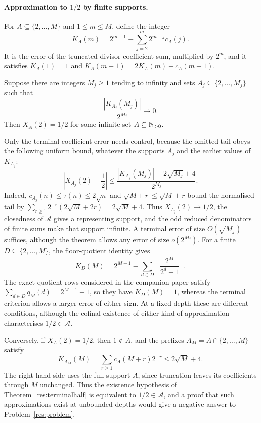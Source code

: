 \documentclass[11pt]{article}
\newcommand{\Ach}{\mathcal A}
\begin{document}
\paragraph{Approximation to $1/2$ by finite supports.}
For $A\subseteq\{2,\ldots,M\}$ and $1\le m\le M$, define the integer
\[
 K_A(m)=2^{m-1}-\sum_{j=2}^{m}2^{m-j}c_A(j).
\]
It is the error of the truncated divisor-coefficient sum, multiplied by
$2^m$, and it satisfies $K_A(1)=1$ and $K_A(m+1)=2K_A(m)-c_A(m+1)$.

\begin{theorem}
\label{res:terminalhalf}
Suppose there are integers $M_j\ge1$ tending to infinity and sets
$A_j\subseteq\{2,\ldots,M_j\}$ such that
\[
 \frac{|K_{A_j}(M_j)|}{2^{M_j}}\longrightarrow0.
\]
Then $X_A(2)=1/2$ for some infinite set $A\subseteq\mathbb{N}_{>0}$.
\end{theorem}

Only the terminal coefficient error needs control, because the omitted
tail obeys the following uniform bound, whatever the supports $A_j$ and
the earlier values of $K_{A_j}$:
\[
 \left|X_{A_j}(2)-\frac12\right|
 \le \frac{|K_{A_j}(M_j)|+2\sqrt{M_j}+4}{2^{M_j}}.
\]
Indeed, $c_{A_j}(n)\le\tau(n)\le2\sqrt n$ and
$\sqrt{M+r}\le\sqrt M+r$ bound the normalised tail by
$\sum_{r\ge1}2^{-r}(2\sqrt M+2r)=2\sqrt M+4$. Thus
$X_{A_j}(2)\to1/2$, the closedness of $\Ach$ gives a representing
support, and the odd reduced denominators of finite sums make that
support infinite. A terminal error of size $O(\sqrt{M_j})$ suffices,
although the theorem allows any error of size $o(2^{M_j})$. For a finite $D\subseteq\{2,\ldots,M\}$, the
floor-quotient identity gives
\[
 K_D(M)=2^{M-1}-\sum_{d\in D}
                \left\lfloor\frac{2^M}{2^d-1}\right\rfloor.
\]
The exact quotient rows considered in the companion paper satisfy
$\sum_{d\in D}q_M(d)=2^{M-1}-1$, so they have $K_D(M)=1$, whereas the
terminal criterion allows a larger error of either sign. At a fixed
depth these are different conditions, although the cofinal existence
of either kind of approximation characterises $1/2\in\Ach$.

Conversely, if $X_A(2)=1/2$, then $1\notin A$, and the prefixes
$A_M=A\cap\{2,\ldots,M\}$ satisfy
\[
 K_{A_M}(M)=\sum_{r\ge1}c_A(M+r)2^{-r}
       \le 2\sqrt M+4.
\]
The right-hand side uses the full support $A$, since truncation leaves
its coefficients through $M$ unchanged. Thus the existence hypothesis of
Theorem~\ref{res:terminalhalf} is equivalent to $1/2\in\Ach$, and a
proof that such approximations exist at unbounded depths would give a
negative answer to Problem~\ref{res:problem}.
\end{document}
